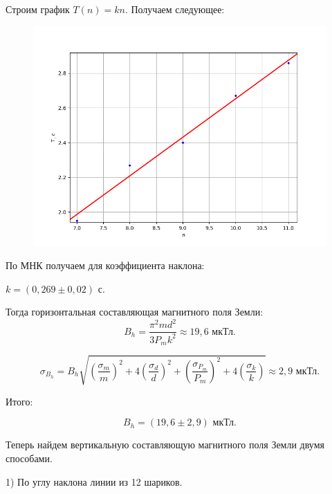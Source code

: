 \documentclass[a4paper,12pt]{article} %
\begin{document}
Строим график $T(n) = kn$. Получаем следующее:

\begin{figure}[h!]
	\centering
	\includegraphics[scale=0.8]{T(n).png}
\end{figure}

По МНК получаем для коэффициента наклона:

$k = (0,269 \pm 0,02)$ с.

Тогда горизонтальная составляющая магнитного поля Земли:
\begin{equation*}
	B_h = \frac{\pi ^2 md^2}{3P_m k^2} \approx 19,6 \text{ мкТл}.
\end{equation*}

\begin{equation*}
	\sigma_{B_h} = B_h \sqrt{\left(\frac{\sigma_m}{m}\right)^2 + 4\left(\frac{\sigma_d}{d}\right)^2 + \left(\frac{\sigma_{P_m}}{P_m}\right)^2 + 4 \left(\frac{\sigma_k}{k}\right)} \approx 2,9 \text{ мкТл}.
\end{equation*}

Итого:

\begin{equation*}
	B_h = (19,6 \pm 2,9) \text{ мкТл}.
\end{equation*}

\newpage

Теперь найдем вертикальную составляющую магнитного поля Земли двумя способами.

1) По углу наклона линии из 12 шариков.
\end{document}
